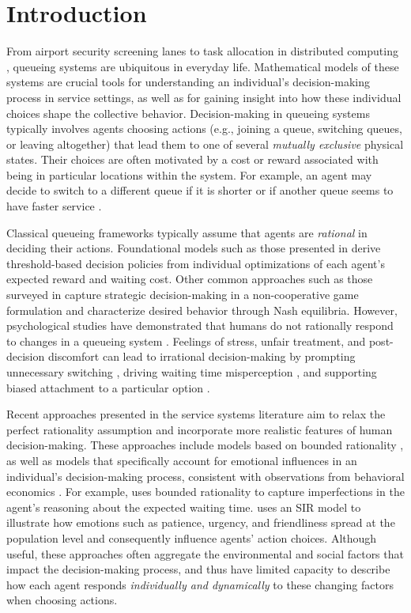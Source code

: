 \documentclass[conference]{IEEEtran}
\begin{document}
\section{Introduction}
From airport security screening lanes \cite{liu2025deep} to task allocation in distributed computing \cite{mitzenmacher2002power}, queueing systems are ubiquitous in everyday life. Mathematical models of these systems are crucial tools for understanding an individual's decision-making process in service settings, as well as for gaining insight into how these individual choices shape the collective behavior.
Decision-making in queueing systems typically involves agents choosing actions (e.g., joining a queue, switching queues, or leaving altogether)\cite{shortle2018fundamentals} that lead them to one of several \emph{mutually exclusive} physical states. 
Their choices are often motivated by a cost or reward associated with being in particular locations within the system. 
For example, an agent may decide to switch to a different queue if it is shorter or if another queue seems to have faster service \cite{koenigsberg1966jockeying}.  

Classical queueing frameworks typically assume that agents are \emph{rational} in deciding their actions.
Foundational models such as those presented in \cite{naor1969regulation, chr1972individual, edelson1975congestion, lin1984optimal} derive threshold-based decision policies from individual optimizations of each agent's expected reward and waiting cost. Other common approaches such as those surveyed in \cite{hassin2003queue} capture strategic decision-making in a non-cooperative game formulation and characterize desired behavior through Nash equilibria.
However, psychological studies have demonstrated that humans do not rationally respond to changes in a queueing system \cite{maister1984psychology, zhou2003looking}.
Feelings of stress, unfair treatment, and post-decision discomfort can lead to irrational decision-making by prompting unnecessary switching \cite{li2025people}, driving waiting time misperception \cite{larson1987or}, and supporting biased attachment to a particular option \cite{carmon2003option}.

Recent approaches presented in the service systems literature aim to relax the perfect rationality assumption and incorporate more realistic features of human decision-making. These approaches include models based on bounded rationality \cite{simon1955behavioral}, as well as models that specifically account for emotional influences in an individual's decision-making process, consistent with observations from behavioral economics \cite{ariely2009end}. 
For example, \cite{huang2013bounded} uses bounded rationality to capture imperfections in the agent's reasoning about the expected waiting time. 
\cite{xue2023personality} uses an SIR model to illustrate how emotions such as patience, urgency, and friendliness spread at the population level and consequently influence agents' action choices. Although useful, these approaches often aggregate the environmental and social factors that impact the decision-making process, and thus have limited capacity to describe how each agent responds \emph{individually and dynamically} to these changing factors when choosing actions.   
\end{document}
